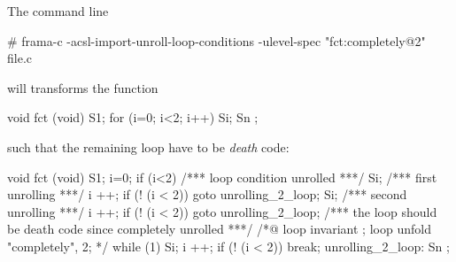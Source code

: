 \documentclass{frama-c-book}
\begin{document}
The command line
\begin{shell}
# frama-c -acsl-import-unroll-loop-conditions -ulevel-spec "fct:completely@2" file.c
\end{shell}
 will transforms the function
\begin{shell}
void fct (void) {
  S1;
  for (i=0; i<2; i++)
    Si;
  Sn ;
}
\end{shell}
such that the remaining loop have to be {\sl death} code:
\begin{shell}
void fct (void) {
  S1;
  i=0;
  if (i<2){ /*** loop condition unrolled ***/
    Si;     /*** first unrolling ***/
    i ++;
    if (! (i < 2)) goto unrolling_2_loop;
      Si;   /*** second unrolling ***/
      i ++;
      if (! (i < 2)) { goto unrolling_2_loop; }
      /*** the loop should be death code since completely unrolled ***/
      /*@ loop invariant \false;
          loop unfold "completely", 2; */
      while (1) {
        Si;
        i ++;
        if (! (i < 2)) break;
        }
unrolling_2_loop:
    }
  Sn ;
}
\end{shell}

\appendix





\cleardoublepage
\end{document}
